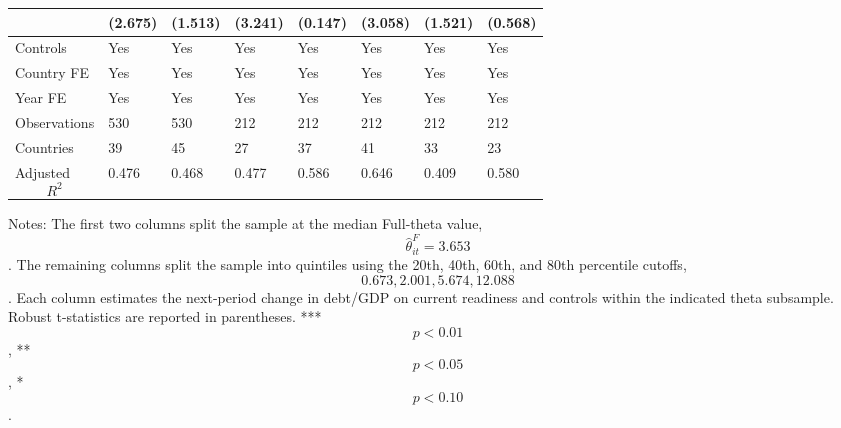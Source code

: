 \begin{table}[H]
\begin{threeparttable}
\begin{tabularx}{\textwidth}{lYYYYYYY}
  & (2.675) & (1.513) & (3.241) & (0.147) & (3.058) & (1.521) & (0.568) \\
\midrule
Controls & Yes & Yes & Yes & Yes & Yes & Yes & Yes \\
Country FE & Yes & Yes & Yes & Yes & Yes & Yes & Yes \\
Year FE & Yes & Yes & Yes & Yes & Yes & Yes & Yes \\
Observations & 530 & 530 & 212 & 212 & 212 & 212 & 212 \\
Countries & 39 & 45 & 27 & 37 & 41 & 33 & 23 \\
Adjusted $$R^2$$ & 0.476 & 0.468 & 0.477 & 0.586 & 0.646 & 0.409 & 0.580 \\
\bottomrule
\end{tabularx}
\begin{tablenotes}[flushleft]\footnotesize
\item Notes: The first two columns split the sample at the median Full-theta value, $$\widehat{\theta}^{F}_{it}=3.653$$. The remaining columns split the sample into quintiles using the 20th, 40th, 60th, and 80th percentile cutoffs, $$0.673, 2.001, 5.674, 12.088$$. Each column estimates the next-period change in debt/GDP on current readiness and controls within the indicated theta subsample. Robust t-statistics are reported in parentheses. *** $$p<0.01$$, ** $$p<0.05$$, * $$p<0.10$$.
\end{tablenotes}
\end{threeparttable}
\end{table}
